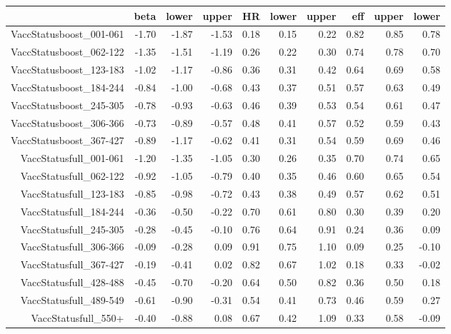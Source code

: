 \begin{table}[ht]
\centering
\begin{tabular}{rrrrrrrrrr}
  \hline
 & beta & lower & upper & HR & lower & upper & eff & upper & lower \\ 
  \hline
VaccStatusboost\_001-061 & -1.70 & -1.87 & -1.53 & 0.18 & 0.15 & 0.22 & 0.82 & 0.85 & 0.78 \\ 
  VaccStatusboost\_062-122 & -1.35 & -1.51 & -1.19 & 0.26 & 0.22 & 0.30 & 0.74 & 0.78 & 0.70 \\ 
  VaccStatusboost\_123-183 & -1.02 & -1.17 & -0.86 & 0.36 & 0.31 & 0.42 & 0.64 & 0.69 & 0.58 \\ 
  VaccStatusboost\_184-244 & -0.84 & -1.00 & -0.68 & 0.43 & 0.37 & 0.51 & 0.57 & 0.63 & 0.49 \\ 
  VaccStatusboost\_245-305 & -0.78 & -0.93 & -0.63 & 0.46 & 0.39 & 0.53 & 0.54 & 0.61 & 0.47 \\ 
  VaccStatusboost\_306-366 & -0.73 & -0.89 & -0.57 & 0.48 & 0.41 & 0.57 & 0.52 & 0.59 & 0.43 \\ 
  VaccStatusboost\_367-427 & -0.89 & -1.17 & -0.62 & 0.41 & 0.31 & 0.54 & 0.59 & 0.69 & 0.46 \\ 
  VaccStatusfull\_001-061 & -1.20 & -1.35 & -1.05 & 0.30 & 0.26 & 0.35 & 0.70 & 0.74 & 0.65 \\ 
  VaccStatusfull\_062-122 & -0.92 & -1.05 & -0.79 & 0.40 & 0.35 & 0.46 & 0.60 & 0.65 & 0.54 \\ 
  VaccStatusfull\_123-183 & -0.85 & -0.98 & -0.72 & 0.43 & 0.38 & 0.49 & 0.57 & 0.62 & 0.51 \\ 
  VaccStatusfull\_184-244 & -0.36 & -0.50 & -0.22 & 0.70 & 0.61 & 0.80 & 0.30 & 0.39 & 0.20 \\ 
  VaccStatusfull\_245-305 & -0.28 & -0.45 & -0.10 & 0.76 & 0.64 & 0.91 & 0.24 & 0.36 & 0.09 \\ 
  VaccStatusfull\_306-366 & -0.09 & -0.28 & 0.09 & 0.91 & 0.75 & 1.10 & 0.09 & 0.25 & -0.10 \\ 
  VaccStatusfull\_367-427 & -0.19 & -0.41 & 0.02 & 0.82 & 0.67 & 1.02 & 0.18 & 0.33 & -0.02 \\ 
  VaccStatusfull\_428-488 & -0.45 & -0.70 & -0.20 & 0.64 & 0.50 & 0.82 & 0.36 & 0.50 & 0.18 \\ 
  VaccStatusfull\_489-549 & -0.61 & -0.90 & -0.31 & 0.54 & 0.41 & 0.73 & 0.46 & 0.59 & 0.27 \\ 
  VaccStatusfull\_550+ & -0.40 & -0.88 & 0.08 & 0.67 & 0.42 & 1.09 & 0.33 & 0.58 & -0.09 \\ 

\end{tabular}
\end{table}
